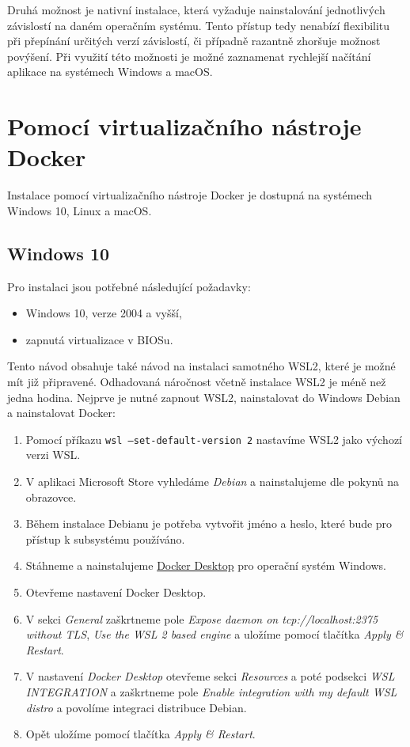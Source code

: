 \documentclass[czech,master]{diploma}
\begin{document}
Druhá možnost je nativní instalace, která vyžaduje nainstalování jednotlivých závislostí na daném operačním systému. Tento přístup tedy nenabízí flexibilitu při přepínání určitých verzí závislostí, či případně razantně zhoršuje možnost povýšení. Při využití této možnosti je možné zaznamenat rychlejší načítání aplikace na systémech Windows a macOS.

\section{Pomocí virtualizačního nástroje Docker}
Instalace pomocí virtualizačního nástroje Docker je dostupná na systémech Windows 10, Linux a macOS.

\subsection{Windows 10}
Pro instalaci jsou potřebné následující požadavky:
\begin{itemize}
\item Windows 10, verze 2004 a vyšší,
\item zapnutá virtualizace v BIOSu.
\end{itemize}

Tento návod obsahuje také návod na instalaci samotného WSL2, které je možné mít již připravené. Odhadovaná náročnost včetně instalace WSL2 je méně než jedna hodina. Nejprve je nutné zapnout WSL2, nainstalovat do Windows Debian a nainstalovat Docker:
\begin{enumerate}
\item Pomocí příkazu \texttt{wsl --set-default-version 2} nastavíme WSL2 jako výchozí verzi WSL.
\item V aplikaci Microsoft Store vyhledáme \textit{Debian} a nainstalujeme dle pokynů na obrazovce.
\item Během instalace Debianu je potřeba vytvořit jméno a heslo, které bude pro přístup k subsystému používáno.
\item Stáhneme a nainstalujeme \href{https://docs.docker.com/docker-for-windows/install/}{Docker Desktop} pro operační systém Windows.
\item Otevřeme nastavení Docker Desktop.
\item V sekci \textit{General} zaškrtneme pole \textit{Expose daemon on tcp://localhost:2375 without TLS}, \textit{Use the WSL 2 based engine} a uložíme pomocí tlačítka \textit{Apply \& Restart}.

\item V nastavení \textit{Docker Desktop} otevřeme sekci \textit{Resources} a poté podsekci \textit{WSL INTEGRATION} a zaškrtneme pole \textit{Enable integration with my default WSL distro} a povolíme integraci distribuce Debian.

\item Opět uložíme pomocí  tlačítka \textit{Apply \& Restart}.
\end{enumerate}
\end{document}
